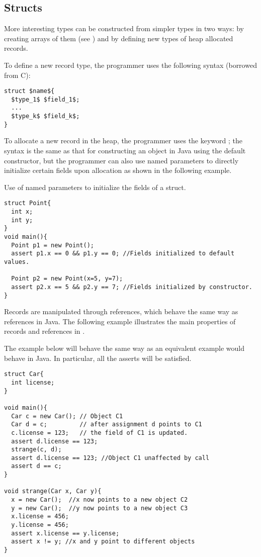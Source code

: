 \subsection{Structs}
More interesting types can be constructed from simpler types in two ways: by creating arrays of them (see ) and by defining new types of heap allocated records.

To define a new record type, the programmer uses the following syntax (borrowed from C):
\begin{lstlisting}
struct $name${
  $type_1$ $field_1$;
  ...
  $type_k$ $field_k$;
}
\end{lstlisting}

To allocate a new record in the heap, the programmer uses the keyword ; the syntax is the same as that for constructing an object in Java using the default constructor, but the programmer can also use named parameters to directly initialize certain fields upon allocation as shown in the following example.

\begin{Example}
Use of named parameters to initialize the fields of a struct.
\begin{lstlisting}
struct Point{
  int x;
  int y;
}
void main(){
  Point p1 = new Point();
  assert p1.x == 0 && p1.y == 0; //Fields initialized to default values.

  Point p2 = new Point(x=5, y=7);
  assert p2.x == 5 && p2.y == 7; //Fields initialized by constructor.
}
\end{lstlisting}
\end{Example}

Records are manipulated through references, which behave the same way as references in Java. The following example illustrates the main properties of records and references in \Sk{}.

\begin{Example}
The example below will behave the same way as an equivalent example would behave in Java. In particular, all the asserts will be satisfied.
\begin{lstlisting}
struct Car{
  int license;
}

void main(){
  Car c = new Car(); // Object C1
  Car d = c;         // after assignment d points to C1
  c.license = 123;   // the field of C1 is updated.
  assert d.license == 123;
  strange(c, d);
  assert d.license == 123; //Object C1 unaffected by call
  assert d == c;
}

void strange(Car x, Car y){
  x = new Car();  //x now points to a new object C2
  y = new Car();  //y now points to a new object C3
  x.license = 456;
  y.license = 456;
  assert x.license == y.license;
  assert x != y; //x and y point to different objects
}
\end{lstlisting}

\end{Example}

